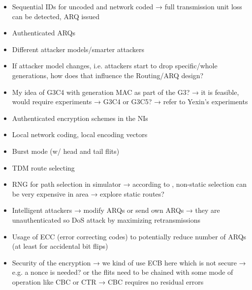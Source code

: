 \begin{itemize}
    \item Sequential IDs for uncoded and network coded → full transmission unit loss can be detected, ARQ issued
    \item Authenticated ARQs
    \item Different attacker models/smarter attackers
    \item If attacker model changes, i.e. attackers start to drop specific/whole generations,
        how does that influence the Routing/ARQ design?
    \item My idea of G3C4 with generation MAC as part of the G3? → it is feasible, would require experiments → G3C4 or G3C5? → refer to Yexin's
        experiments
    \item Authenticated encryption schemes in the NIs
    \item Local network coding, local encoding vectors
    \item Burst mode (w/ head and tail flits)
    \item TDM route selecting
    \item RNG for path selection in simulator → according to \cite{stefan11enhancingnocs}, non-static selection can be very expensive in area →
        explore static routes?
    \item Intelligent attackers → modify ARQs or send own ARQs → they are unauthenticated so DoS attack by maximizing retransmissions
    \item Usage of ECC (error correcting codes) to potentially reduce number of ARQs (at least for accidental bit flips)
    \item Security of the encryption → we kind of use ECB here which is not secure → e.g. a nonce is needed? or the flits need to be chained with some
        mode of operation like CBC or CTR → CBC requires no residual errors
\end{itemize}
